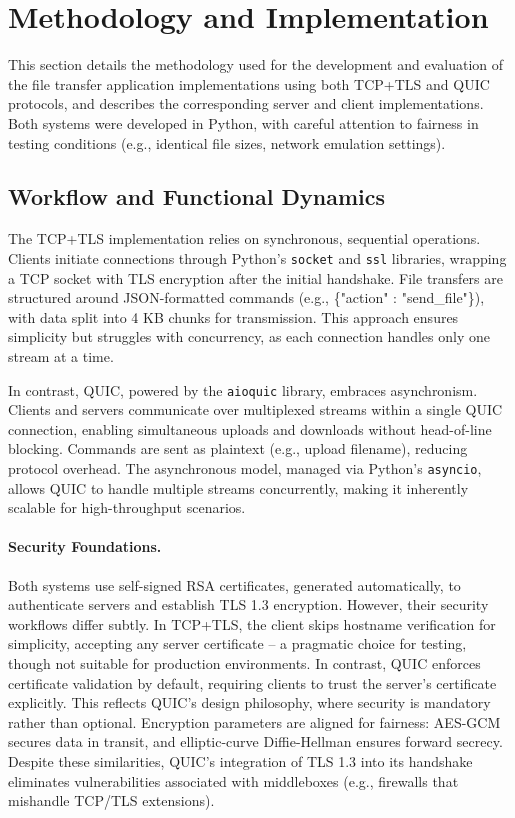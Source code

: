 \section{Methodology and Implementation}
This section details the methodology used for the development and evaluation of the file transfer application implementations using both TCP+TLS and QUIC protocols, and describes the corresponding server and client implementations. Both systems were developed in Python, with careful attention to fairness in testing conditions (e.g., identical file sizes, network emulation settings).

\subsection{Workflow and Functional Dynamics}
The TCP+TLS implementation relies on synchronous, sequential operations. Clients initiate connections through Python's \texttt{socket} and \texttt{ssl} libraries, wrapping a TCP socket with TLS encryption after the initial handshake. File transfers are structured around JSON-formatted commands (e.g., \{"action" : "send\_file"\}), with data split into 4 KB chunks for transmission. This approach ensures simplicity but struggles with concurrency, as each connection handles only one stream at a time.

In contrast, QUIC, powered by the \texttt{aioquic} library, embraces asynchronism. Clients and servers communicate over multiplexed streams within a single QUIC connection, enabling simultaneous uploads and downloads without head-of-line blocking. Commands are sent as plaintext (e.g., upload filename), reducing protocol overhead. The asynchronous model, managed via Python's \texttt{asyncio}, allows QUIC to handle multiple streams concurrently, making it inherently scalable for high-throughput scenarios.

\paragraph{Security Foundations.} Both systems use self-signed RSA certificates, generated automatically, to authenticate servers and establish TLS 1.3 encryption. However, their security workflows differ subtly. In TCP+TLS, the client skips hostname verification for simplicity, accepting any server certificate -- a pragmatic choice for testing, though not suitable for production environments. In contrast, QUIC enforces certificate validation by default, requiring clients to trust the server's certificate explicitly. This reflects QUIC's design philosophy, where security is mandatory rather than optional. Encryption parameters are aligned for fairness: AES-GCM secures data in transit, and elliptic-curve Diffie-Hellman ensures forward secrecy. Despite these similarities, QUIC's integration of TLS 1.3 into its handshake eliminates vulnerabilities associated with middleboxes (e.g., firewalls that mishandle TCP/TLS extensions).

